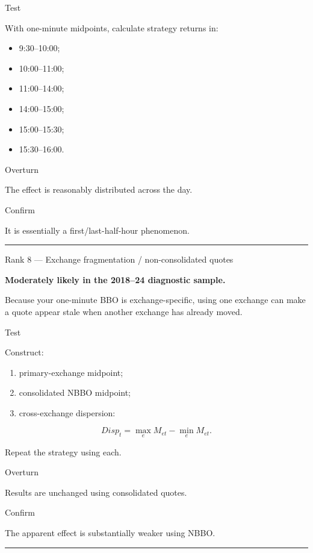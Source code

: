 Test

With one-minute midpoints, calculate strategy returns in:

\begin{itemize}
\tightlist
\item
  9:30--10:00;
\item
  10:00--11:00;
\item
  11:00--14:00;
\item
  14:00--15:00;
\item
  15:00--15:30;
\item
  15:30--16:00.
\end{itemize}

Overturn

The effect is reasonably distributed across the day.

Confirm

It is essentially a first/last-half-hour phenomenon.

\begin{center}\rule{0.5\linewidth}{0.5pt}\end{center}

Rank 8 --- Exchange fragmentation / non-consolidated quotes

\textbf{Moderately likely in the 2018--24 diagnostic sample.}

Because your one-minute BBO is exchange-specific, using one exchange can make a quote appear stale when another exchange has already moved.

Test

Construct:

\begin{enumerate}
\def\labelenumi{\arabic{enumi}.}
\tightlist
\item
  primary-exchange midpoint;
\item
  consolidated NBBO midpoint;
\item
  cross-exchange dispersion:
\end{enumerate}

\[
  Disp_t = \max_e M_{et}-\min_e M_{et}.
  \]

Repeat the strategy using each.

Overturn

Results are unchanged using consolidated quotes.

Confirm

The apparent effect is substantially weaker using NBBO.

\begin{center}\rule{0.5\linewidth}{0.5pt}\end{center}

